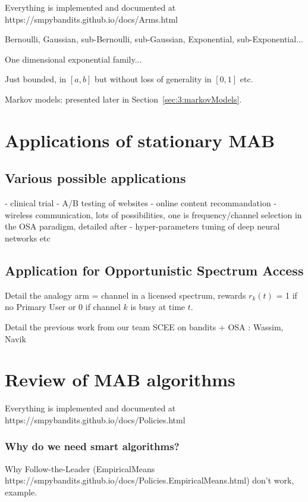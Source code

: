 Everything is implemented and documented at
https://smpybandits.github.io/docs/Arms.html

Bernoulli, Gaussian, sub-Bernoulli, sub-Gaussian, Exponential, sub-Exponential...

One dimensional exponential family...

Just bounded, in $[a,b]$ but without loss of generality in $[0,1]$ etc.

Markov models: presented later in Section~\ref{sec:3:markovModels}.


\section{Applications of stationary MAB}
\label{sec:2:applicationsofStationaryMAB}

\subsection{Various possible applications}

- clinical trial
- A/B testing of websites
- online content recommandation
- wireless communication, lots of possibilities, one is frequency/channel selection in the OSA paradigm, detailed after
- hyper-parameters tuning of deep neural networks etc


\subsection{Application for Opportunistic Spectrum Access}

Detail the analogy arm = channel in a licensed spectrum, rewards $r_k(t)$ = 1 if no Primary User or 0 if channel $k$ is busy at time $t$.

Detail the previous work from our team SCEE on bandits + OSA : Wassim, Navik


\section{Review of MAB algorithms}
\label{sec:2:famousMABalgorithms}

Everything is implemented and documented at
https://smpybandits.github.io/docs/Policies.html


\subsubsection{Why do we need smart algorithms?}
Why Follow-the-Leader (EmpiricalMeans https://smpybandits.github.io/docs/Policies.EmpiricalMeans.html) don't work, example.

